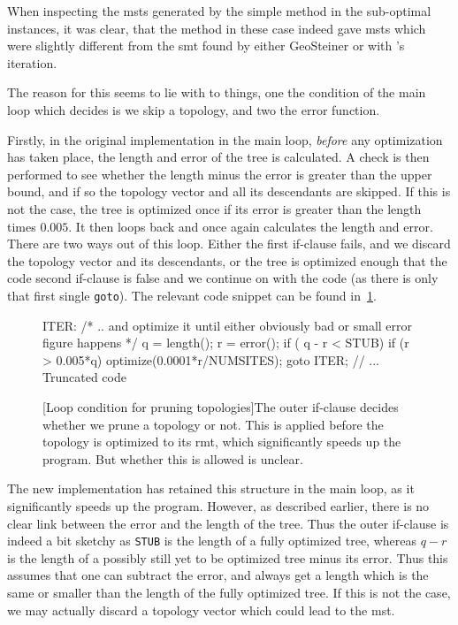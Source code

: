 When inspecting the \acp{mst} generated by the simple method in the sub-optimal
instances, it was clear, that the method in these case indeed gave \acp{mst}
which were slightly different from the \ac{smt} found by either GeoSteiner or
with \citeauthor{smith1992}'s iteration. 

The reason for this seems to lie with to things, one the condition of the main
loop which decides is we skip a topology, and two the error function.

Firstly, in the original implementation in the main loop, \textit{before} any
optimization has taken place, the length and error of the tree is calculated. A
check is then performed to see whether the length minus the error is greater
than the upper bound, and if so the topology vector and all its descendants are
skipped. If this is not the case, the tree is optimized once if its error is
greater than the length times $0.005$. It then loops back and once again
calculates the length and error. There are two ways out of this loop. Either the
first if-clause fails, and we discard the topology vector and its descendants,
or the tree is optimized enough that the code second if-clause is false and we
continue on with the code (as there is only that first single \texttt{goto}).
The relevant code snippet can be found in~\cref{fig:loop-condition-pruning}. 
%
\begin{figure}[htbp]
\begin{c-code}
  ITER: /* .. and optimize it until either obviously bad
              or small error figure happens */
    q = length();
    r = error();
    if ( q - r < STUB) {
      if (r > 0.005*q) { optimize(0.0001*r/NUMSITES); goto ITER; }
      // ... Truncated code
    }
\end{c-code}
  [Loop condition for pruning topologies]{The outer if-clause
    decides whether we prune a topology or not. This is applied before the
    topology is optimized to its \acs{rmt}, which significantly speeds up the
    program. But whether this is allowed is unclear.\label{fig:loop-condition-pruning}}
\end{figure}
%
The new implementation has retained this structure in the main loop, as it
significantly speeds up the program. However, as described earlier, there is no
clear link between the error and the length of the tree. Thus the outer
if-clause is indeed a bit sketchy as \texttt{STUB} is the length of a fully
optimized tree, whereas $q - r$ is the length of a possibly still yet to be optimized
tree minus its error. Thus this assumes that one can subtract the error, and
always get a length which is the same or smaller than the length of the fully
optimized tree. If this is not the case, we may actually discard a topology
vector which could lead to the \ac{mst}.

